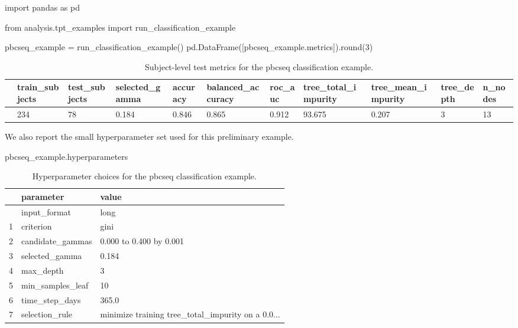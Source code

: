 \documentclass[
  letterpaper,
  DIV=11,
  numbers=noendperiod]{scrartcl}
\newenvironment{Shaded}{\begin{snugshade}}{\end{snugshade}}
\newcommand{\BuiltInTok}[1]{\textcolor[rgb]{0.00,0.23,0.31}{#1}}
\newcommand{\DecValTok}[1]{\textcolor[rgb]{0.68,0.00,0.00}{#1}}
\newcommand{\ImportTok}[1]{\textcolor[rgb]{0.00,0.46,0.62}{#1}}
\newcommand{\NormalTok}[1]{\textcolor[rgb]{0.00,0.23,0.31}{#1}}
\newcommand{\OperatorTok}[1]{\textcolor[rgb]{0.37,0.37,0.37}{#1}}
\begin{document}
\begin{Shaded}
\begin{Highlighting}[]
\ImportTok{import}\NormalTok{ pandas }\ImportTok{as}\NormalTok{ pd}

\ImportTok{from}\NormalTok{ analysis.tpt\_examples }\ImportTok{import}\NormalTok{ run\_classification\_example}

\NormalTok{pbcseq\_example }\OperatorTok{=}\NormalTok{ run\_classification\_example()}
\NormalTok{pd.DataFrame([pbcseq\_example.metrics]).}\BuiltInTok{round}\NormalTok{(}\DecValTok{3}\NormalTok{)}
\end{Highlighting}
\end{Shaded}

\begin{longtable}[]{@{}lllllllllll@{}}

\caption{\label{tbl-pbcseq-metrics}Subject-level test metrics for the
pbcseq classification example.}

\tabularnewline

\toprule\noalign{}
& train\_subjects & test\_subjects & selected\_gamma & accuracy &
balanced\_accuracy & roc\_auc & tree\_total\_impurity &
tree\_mean\_impurity & tree\_depth & n\_nodes \\
\midrule\noalign{}
\endhead
\bottomrule\noalign{}
\endlastfoot
0 & 234 & 78 & 0.184 & 0.846 & 0.865 & 0.912 & 93.675 & 0.207 & 3 &
13 \\

\end{longtable}

We also report the small hyperparameter set used for this preliminary
example.

\begin{Shaded}
\begin{Highlighting}[]
\NormalTok{pbcseq\_example.hyperparameters}
\end{Highlighting}
\end{Shaded}

\begin{longtable}[]{@{}lll@{}}

\caption{\label{tbl-pbcseq-hyperparameters}Hyperparameter choices for
the pbcseq classification example.}

\tabularnewline

\toprule\noalign{}
& parameter & value \\
\midrule\noalign{}
\endhead
\bottomrule\noalign{}
\endlastfoot
0 & input\_format & long \\
1 & criterion & gini \\
2 & candidate\_gammas & 0.000 to 0.400 by 0.001 \\
3 & selected\_gamma & 0.184 \\
4 & max\_depth & 3 \\
5 & min\_samples\_leaf & 10 \\
6 & time\_step\_days & 365.0 \\
7 & selection\_rule & minimize training tree\_total\_impurity on a
0.0... \\

\end{longtable}
\end{document}
